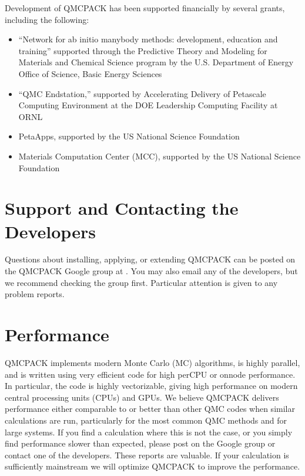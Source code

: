 \documentclass[letterpaper,10pt,english]{sphinxmanual}
\begin{document}
Development of QMCPACK has been supported financially by several grants,
including the following:
\begin{itemize}
\item {} 
“Network for ab initio many\sphinxhyphen{}body methods: development, education and
training” supported through the Predictive Theory and Modeling for
Materials and Chemical Science program by the U.S. Department of
Energy Office of Science, Basic Energy Sciences

\item {} 
“QMC Endstation,” supported by Accelerating Delivery of Petascale
Computing Environment at the DOE Leadership Computing Facility at
ORNL

\item {} 
PetaApps, supported by the US National Science Foundation

\item {} 
Materials Computation Center (MCC), supported by the US National
Science Foundation

\end{itemize}


\section{Support and Contacting the Developers}
\label{\detokenize{introduction:support-and-contacting-the-developers}}\label{\detokenize{introduction:support}}
Questions about installing, applying, or extending QMCPACK can be posted
on the QMCPACK Google group at
. You may also email any
of the developers, but we recommend checking the group first. Particular
attention is given to any problem reports.


\section{Performance}
\label{\detokenize{introduction:performance}}\label{\detokenize{introduction:id2}}
QMCPACK implements modern Monte Carlo (MC) algorithms, is highly
parallel, and is written using very efficient code for high per\sphinxhyphen{}CPU or
on\sphinxhyphen{}node performance. In particular, the code is highly vectorizable,
giving high performance on modern central processing units (CPUs) and
GPUs. We believe QMCPACK delivers performance either comparable to or
better than other QMC codes when similar calculations are run,
particularly for the most common QMC methods and for large systems. If
you find a calculation where this is not the case, or you simply find
performance slower than expected, please post on the Google group or
contact one of the developers. These reports are valuable. If your
calculation is sufficiently mainstream we will optimize QMCPACK to
improve the performance.
\end{document}
